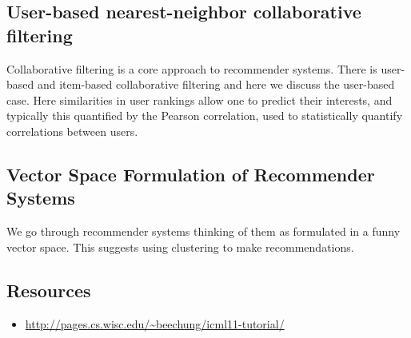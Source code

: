 



\subsection{User-based nearest-neighbor collaborative
filtering}\label{user-based-nearest-neighbor-collaborative-filtering}

Collaborative filtering is a core approach to recommender systems. There
is user-based and item-based collaborative filtering and here we discuss
the user-based case. Here similarities in user rankings allow one to
predict their interests, and typically this quantified by the Pearson
correlation, used to statistically quantify correlations between users.




\subsection{Vector Space Formulation of Recommender
Systems}\label{vector-space-formulation-of-recommender-systems}

We go through recommender systems thinking of them as formulated in a
funny vector space. This suggests using clustering to make
recommendations.



\subsection{Resources}\label{resources-1}

\begin{itemize}

\item
  \url{http://pages.cs.wisc.edu/~beechung/icml11-tutorial/}
\end{itemize}

